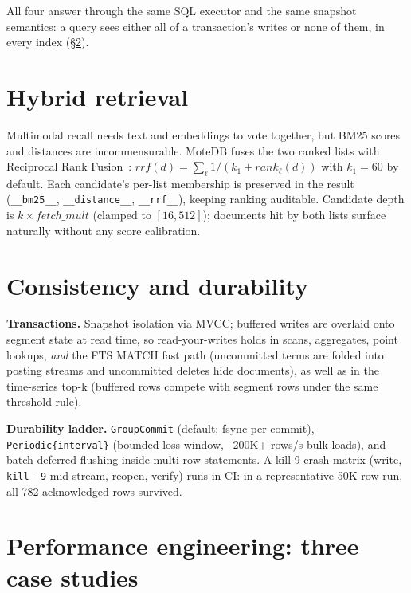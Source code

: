 \documentclass[10pt]{article}
\begin{document}
All four answer through the same SQL executor and the same snapshot
semantics: a query sees either all of a transaction's writes or none of
them, in every index (\S\ref{sec:durability}).

\section{Hybrid retrieval}
\label{sec:hybrid}

Multimodal recall needs text and embeddings to vote together, but BM25
scores and distances are incommensurable. MoteDB fuses the two ranked lists
with Reciprocal Rank Fusion~\cite{cormack2009}:
$rrf(d) = \sum_{\ell} 1/(k_1 + rank_\ell(d))$ with $k_1{=}60$ by default.
Each candidate's per-list membership is preserved in the result
(\texttt{\_\_bm25\_\_}, \texttt{\_\_distance\_\_}, \texttt{\_\_rrf\_\_}),
keeping ranking auditable. Candidate depth is $k \times fetch\_mult$
(clamped to $[16, 512]$); documents hit by both lists surface naturally
without any score calibration.

\section{Consistency and durability}
\label{sec:durability}

\textbf{Transactions.} Snapshot isolation via MVCC; buffered writes are
overlaid onto segment state at read time, so read-your-writes holds in
scans, aggregates, point lookups, \emph{and} the FTS MATCH fast path
(uncommitted terms are folded into posting streams and uncommitted deletes
hide documents), as well as in the time-series top-k (buffered rows compete
with segment rows under the same threshold rule).

\textbf{Durability ladder.} \texttt{GroupCommit} (default; fsync per
commit), \texttt{Periodic\{interval\}} (bounded loss window, ~200K+ rows/s
bulk loads), and batch-deferred flushing inside multi-row statements. A
kill-9 crash matrix (write, \texttt{kill -9} mid-stream, reopen, verify)
runs in CI: in a representative 50K-row run, all 782 acknowledged rows
survived.

\section{Performance engineering: three case studies}
\label{sec:cases}
\end{document}
